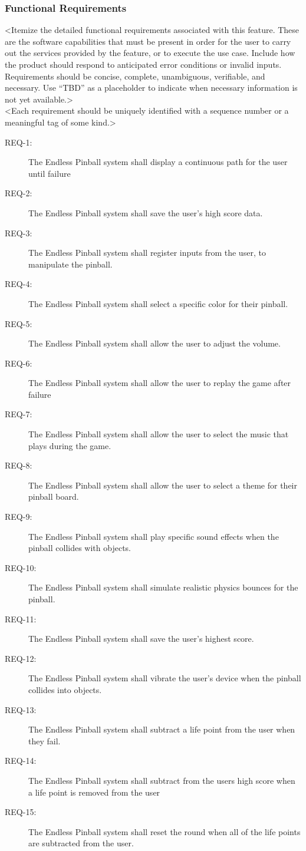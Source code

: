 \documentclass[11pt]{article}
\begin{document}
\subsubsection{Functional Requirements}
\label{sec:orgb0b3e7c}
<Itemize the detailed functional requirements associated with this feature. These are the software capabilities that must be present in order for the user to carry out the services provided by the feature, or to execute the use case. Include how the product should respond to anticipated error conditions or invalid inputs. Requirements should be concise, complete, unambiguous, verifiable, and necessary. Use “TBD” as a placeholder to indicate when necessary information is not yet available.>\\
<Each requirement should be uniquely identified with a sequence number or a meaningful tag of some kind.>
\begin{description}
\item[{REQ-1:}] The Endless Pinball system shall display a continuous path for the user until failure
\item[{REQ-2:}] The Endless Pinball system shall save the user’s high score data.
\item[{REQ-3:}] The Endless Pinball system shall register inputs from the user, to manipulate the pinball.
\item[{REQ-4:}] The Endless Pinball system shall select a specific color for their pinball.
\item[{REQ-5:}] The Endless Pinball system shall allow the user to adjust the volume.
\item[{REQ-6:}] The Endless Pinball system shall allow the user to replay the game after failure
\item[{REQ-7:}] The Endless Pinball system shall allow the user to select the music that plays during the game.
\item[{REQ-8:}] The Endless Pinball system shall allow the user to select a theme for their pinball board.
\item[{REQ-9:}] The Endless Pinball system shall play specific sound effects when the pinball collides with objects.
\item[{REQ-10:}] The Endless Pinball system shall simulate realistic physics bounces for the pinball.
\item[{REQ-11:}] The Endless Pinball system shall save the user’s highest score.
\item[{REQ-12:}] The Endless Pinball system shall vibrate the user’s device when the pinball collides into objects.
\item[{REQ-13:}] The Endless Pinball system shall subtract a life point from the user when they fail.
\item[{REQ-14:}] The Endless Pinball system shall subtract from the users high score when a life point is removed from the user
\item[{REQ-15:}] The Endless Pinball system shall reset the round when all of the life points are subtracted from the user.
\end{description}
\end{document}
